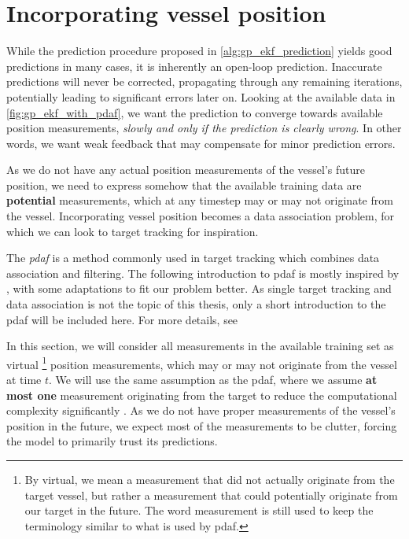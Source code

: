 \section{Incorporating vessel position}
While the prediction procedure proposed in \cref{alg:gp_ekf_prediction} yields good predictions in many cases, it is inherently an open-loop prediction. Inaccurate predictions will never be corrected, propagating through any remaining iterations, potentially leading to significant errors later on. Looking at the available data in \cref{fig:gp_ekf_with_pdaf}, we want the prediction to converge towards available position measurements, \textit{slowly and only if the prediction is clearly wrong}. In other words, we want weak feedback that may compensate for minor prediction errors.

As we do not have any actual position measurements of the vessel's future position, we need to express somehow that the available training data are \textbf{potential} measurements, which at any timestep may or may not originate from the vessel. Incorporating vessel position becomes a data association problem, for which we can look to target tracking for inspiration.

The \textit{\acrfull{pdaf}} is a method commonly used in target tracking which combines data association and filtering. The following introduction to \acrshort{pdaf} is mostly inspired by \cite{sensorfusjon}, with some adaptations to fit our problem better. As single target tracking and data association is not the topic of this thesis, only a short introduction to the \acrshort{pdaf} will be included here. For more details, see \cite{sensorfusjon,bar1995multitarget}

In this section, we will consider all measurements in the available training set as virtual \footnote{By virtual, we mean a measurement that did not actually originate from the target vessel, but rather a measurement that could potentially originate from our target in the future. The word measurement is still used to keep the terminology similar to what is used by \acrshort{pdaf}.} position measurements, which may or may not originate from the vessel at time $t$. We will use the same assumption as the \acrshort{pdaf}, where we assume \textbf{at most one} measurement originating from the target to reduce the computational complexity significantly \cite{sensorfusjon}. As we do not have proper measurements of the vessel's position in the future, we expect most of the measurements to be clutter, forcing the model to primarily trust its predictions.

